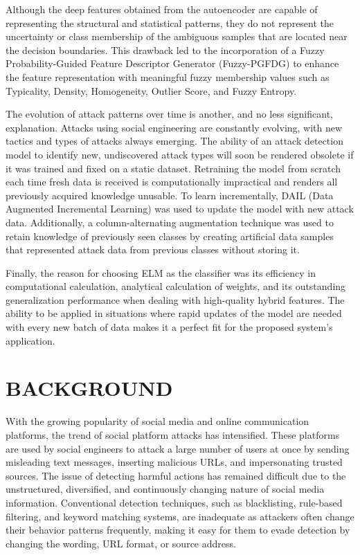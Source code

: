 Although the deep features obtained from the autoencoder are capable of
representing the structural and statistical patterns, they do not represent the
uncertainty or class membership of the ambiguous samples that are located near
the decision boundaries. This drawback led to the incorporation of a Fuzzy
Probability-Guided Feature Descriptor Generator (Fuzzy-PGFDG) to enhance the
feature representation with meaningful fuzzy membership values such as
Typicality, Density, Homogeneity, Outlier Score, and Fuzzy Entropy.

The evolution of attack patterns over time is another, and no less significant, explanation. Attacks using social engineering are constantly evolving, with new tactics and types of attacks always emerging. The ability of an attack detection model to identify new, undiscovered attack types will soon be rendered obsolete if it was trained and fixed on a static dataset. Retraining the model from scratch each time fresh data is received is computationally impractical and renders all previously acquired knowledge unusable. To learn incrementally, DAIL (Data Augmented Incremental Learning) was used to update the model with new attack data. Additionally, a column-alternating augmentation technique was used to retain knowledge of previously seen classes by creating artificial data samples that represented attack data from previous classes without storing it.

Finally, the reason for choosing ELM as the classifier was its efficiency in computational calculation, analytical calculation of weights, and its outstanding generalization performance when dealing with high-quality hybrid features. The ability to be applied in situations where rapid updates of the model are needed with every new batch of data makes it a perfect fit for the proposed system’s application.

\section{BACKGROUND}
With the growing popularity of social media and online communication platforms, the trend of social platform attacks has intensified. These platforms are used by social engineers to attack a large number of users at once by sending misleading text messages, inserting malicious URLs, and impersonating trusted sources. The issue of detecting harmful actions has remained difficult due to the unstructured, diversified, and continuously changing nature of social media information. Conventional detection techniques, such as blacklisting, rule-based filtering, and keyword matching systems, are inadequate as attackers often change their behavior patterns frequently, making it easy for them to evade detection by changing the wording, URL format, or source address.

